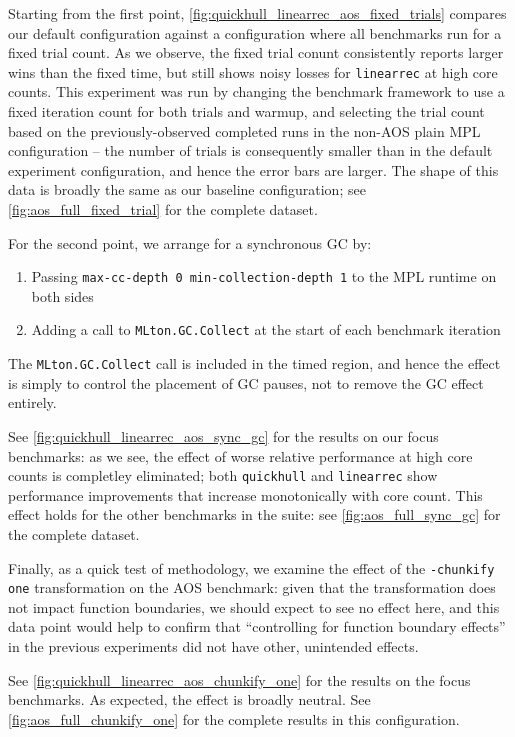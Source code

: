 \documentclass[leqno,11pt]{article}
\begin{document}
Starting from the first point,
\cref{fig:quickhull_linearrec_aos_fixed_trials} compares our default
configuration against a configuration where all benchmarks run for a fixed trial
count. As we observe, the fixed trial conunt consistently reports larger wins
than the fixed time, but still shows noisy losses for \texttt{linearrec} at high
core counts. This experiment was run by changing the benchmark framework to use
a fixed iteration count for both trials and warmup, and selecting the trial
count based on the previously-observed completed runs in the non-AOS plain MPL
configuration -- the number of trials is consequently smaller than in the
default experiment configuration, and hence the error bars are larger. The shape
of this data is broadly the same as our baseline configuration; see
\cref{fig:aos_full_fixed_trial} for the complete dataset.

For the second point, we arrange for a synchronous GC by:
\begin{enumerate}
\item Passing \texttt{max-cc-depth 0 min-collection-depth 1} to the MPL runtime
  on both sides
\item Adding a call to \texttt{MLton.GC.Collect} at the start of each benchmark iteration
\end{enumerate}

The \texttt{MLton.GC.Collect} call is included in the timed region, and hence
the effect is simply to control the placement of GC pauses, not to remove the GC
effect entirely.

See \cref{fig:quickhull_linearrec_aos_sync_gc} for the results on our focus
benchmarks: as we see, the effect of worse relative performance at high core
counts is completley eliminated; both \texttt{quickhull} and \texttt{linearrec}
show performance improvements that increase monotonically with core count. This
effect holds for the other benchmarks in the suite: see
\cref{fig:aos_full_sync_gc} for the complete dataset.

Finally, as a quick test of methodology, we examine the effect of the
\texttt{-chunkify one} transformation on the AOS benchmark: given that the
transformation does not impact function boundaries, we should expect to see no
effect here, and this data point would help to confirm that ``controlling for
function boundary effects'' in the previous experiments did not have other,
unintended effects.

See \cref{fig:quickhull_linearrec_aos_chunkify_one} for the results on the focus
benchmarks. As expected, the effect is broadly neutral. See
\cref{fig:aos_full_chunkify_one} for the complete results in this configuration.
\end{document}
